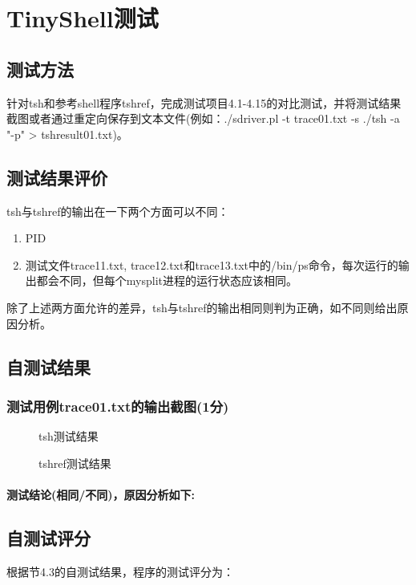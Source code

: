 \section{TinyShell测试}

\subsection{测试方法}
针对tsh和参考shell程序tshref，完成测试项目4.1-4.15的对比测试，并将测试结果截图或者通过重定向保存到文本文件(例如：./sdriver.pl -t trace01.txt -s ./tsh -a "-p" > tshresult01.txt)。

\subsection{测试结果评价}
tsh与tshref的输出在一下两个方面可以不同：

\begin{enumerate}
\item PID
\item 测试文件trace11.txt, trace12.txt和trace13.txt中的/bin/ps命令，每次运行的输出都会不同，但每个mysplit进程的运行状态应该相同。
\end{enumerate}

除了上述两方面允许的差异，tsh与tshref的输出相同则判为正确，如不同则给出原因分析。

\subsection{自测试结果}

\subsubsection{测试用例trace01.txt的输出截图(1分)}

\begin{figure}[H]
\begin{minipage}[c]{0.5\linewidth}
    \centering
    \caption{tsh测试结果}
\end{minipage}
\begin{minipage}[c]{0.5\linewidth}
    \centering
    \caption{tshref测试结果}
\end{minipage}
\end{figure}

\paragraph{测试结论(相同/不同)，原因分析如下:}



\subsection{自测试评分}

根据节4.3的自测试结果，程序的测试评分为：